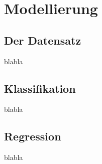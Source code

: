 \chapter{Modellierung}

\section{Der Datensatz}

blabla

\section{Klassifikation}

blabla

\section{Regression}

blabla